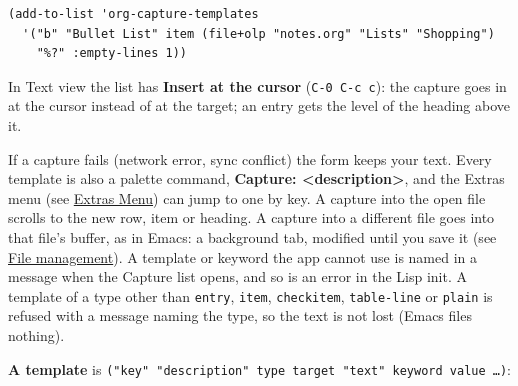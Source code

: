 \documentclass[11pt]{article}
\begin{document}
\begin{verbatim}
(add-to-list 'org-capture-templates
  '("b" "Bullet List" item (file+olp "notes.org" "Lists" "Shopping")
    "%?" :empty-lines 1))
\end{verbatim}

In Text view the list has \textbf{Insert at the cursor} (\texttt{C-0 C-c c}): the capture goes in at the cursor instead of at the target; an entry gets the level of the heading above it.

If a capture fails (network error, sync conflict) the form keeps your text. Every template is also a palette command, \textbf{Capture: <description>}, and the Extras menu (see \hyperref[sec:org147f9a0]{Extras Menu}) can jump to one by key. A capture into the open file scrolls to the new row, item or heading. A capture into a different file goes into that file's buffer, as in Emacs: a background tab, modified until you save it (see \hyperref[sec:orgc48c2f3]{File management}). A template or keyword the app cannot use is named in a message when the Capture list opens, and so is an error in the Lisp init. A template of a type other than \texttt{entry}, \texttt{item}, \texttt{checkitem}, \texttt{table-line} or \texttt{plain} is refused with a message naming the type, so the text is not lost (Emacs files nothing).

\textbf{A template} is \texttt{("key" "description" type target "text" keyword value …)}:
\end{document}
